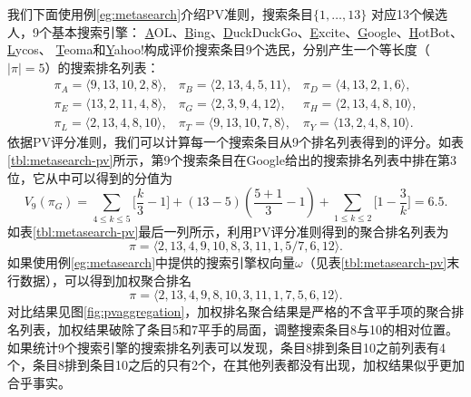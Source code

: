我们下面使用例\ref{eg:metasearch}介绍PV准则，搜索条目$\{1,\ldots,13\}$ 对应13个候选人，9个基本搜索引擎：
\underline{A}OL、\underline{B}ing、\underline{D}uckDuckGo、\underline{E}xcite、\underline{G}oogle、\underline{H}otBot、\underline{L}ycos、
\underline{T}eoma和\underline{Y}ahoo!构成评价搜索条目9个选民，分别产生一个等长度（$|\pi|=5$）的搜索排名列表：
\[
\begin{array}{lll}
    \pi_A =\langle 9,13,10,2,8\rangle, & \pi_B = \langle 2,13,4,5,11\rangle, & \pi_D = \langle 4,13,2,1,6\rangle, \\
    \pi_E = \langle 13,2,11,4,8\rangle, & \pi_G = \langle 2,3,9,4,12\rangle, & \pi_H = \langle 2,13,4,8,10\rangle, \\
    \pi_L = \langle 2,13,4,8,10\rangle, & \pi_T = \langle 9,13,10,7,8\rangle, & \pi_Y = \langle 13,2,4,8,10\rangle.
\end{array}
\]
依据PV评分准则，我们可以计算每一个搜索条目从9个排名列表得到的评分。如表\ref{tbl:metasearch-pv}所示，第9个搜索条目在Google给出的搜索排名列表中排在第3位，它从中可以得到的分值为
\[
    V_9(\pi_G) = \sum\limits_{4\le k \le 5} \big[\frac{k}{3} -1\big] + (13-5)(\frac{5+1}{3}-1) + \sum\limits_{1\le k \le 2} \big[1-\frac{3}{k}\big] = 6.5.
\]
如表\ref{tbl:metasearch-pv}最后一列所示，利用PV评分准则得到的聚合排名列表为
\[\pi = \langle 2, 13, 4, 9, 10, 8, 3, 11, 1, 5/7, 6, 12\rangle.\]
如果使用例\ref{eg:metasearch}中提供的搜索引擎权向量$\omega$（见表\ref{tbl:metasearch-pv}末行数据），可以得到加权聚合排名
\[\pi = \langle 2, 13, 4, 9, 8, 10, 3, 11, 1, 7, 5, 6, 12\rangle.\]
对比结果见图\ref{fig:pvaggregation}，加权排名聚合结果是严格的不含平手项的聚合排名列表，加权结果破除了条目5和7平手的局面，调整搜索条目8与10的相对位置。如果统计9个搜索引擎的搜索排名列表可以发现，条目8排到条目10之前列表有4个，条目8排到条目10之后的只有2个，在其他列表都没有出现，加权结果似乎更加合乎事实。
